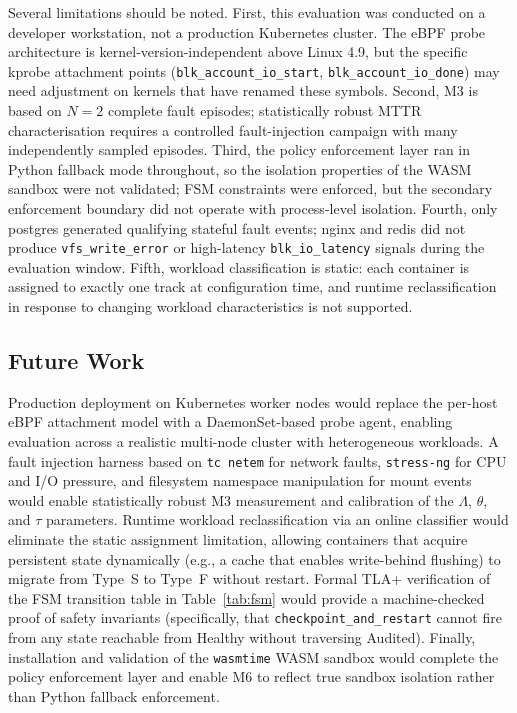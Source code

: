 \documentclass[runningheads]{llncs}
\begin{document}
Several limitations should be noted. First, this evaluation was
conducted on a developer workstation, not a production Kubernetes
cluster. The eBPF probe architecture is kernel-version-independent
above Linux 4.9, but the specific kprobe attachment points
(\texttt{blk\_account\_io\_start}, \texttt{blk\_account\_io\_done})
may need adjustment on kernels that have renamed these symbols.
Second, M3 is based on $N=2$ complete fault episodes; statistically
robust MTTR characterisation requires a controlled fault-injection
campaign with many independently sampled episodes. Third, the policy
enforcement layer ran in Python fallback mode throughout, so the
isolation properties of the WASM sandbox were not validated; FSM
constraints were enforced, but the secondary enforcement boundary
did not operate with process-level isolation. Fourth, only postgres
generated qualifying stateful fault events; nginx and redis did not
produce \texttt{vfs\_write\_error} or high-latency
\texttt{blk\_io\_latency} signals during the evaluation window.
Fifth, workload classification is static: each container is assigned
to exactly one track at configuration time, and runtime
reclassification in response to changing workload characteristics
is not supported.

\subsection{Future Work}

Production deployment on Kubernetes worker nodes would replace the
per-host eBPF attachment model with a DaemonSet-based probe agent,
enabling evaluation across a realistic multi-node cluster with
heterogeneous workloads. A fault injection harness based on
\texttt{tc netem} for network faults, \texttt{stress-ng} for CPU and
I/O pressure, and filesystem namespace manipulation for mount events
would enable statistically robust M3 measurement and calibration of
the $\Lambda$, $\theta$, and $\tau$ parameters. Runtime workload
reclassification via an online classifier would eliminate the static
assignment limitation, allowing containers that acquire persistent
state dynamically (e.g., a cache that enables write-behind flushing)
to migrate from Type~S to Type~F without restart. Formal TLA+
verification of the FSM transition table in Table~\ref{tab:fsm}
would provide a machine-checked proof of safety invariants
(specifically, that \texttt{checkpoint\_and\_restart} cannot fire
from any state reachable from Healthy without traversing Audited).
Finally, installation and validation of the \texttt{wasmtime} WASM
sandbox would complete the policy enforcement layer and enable M6
to reflect true sandbox isolation rather than Python fallback enforcement.
\end{document}
